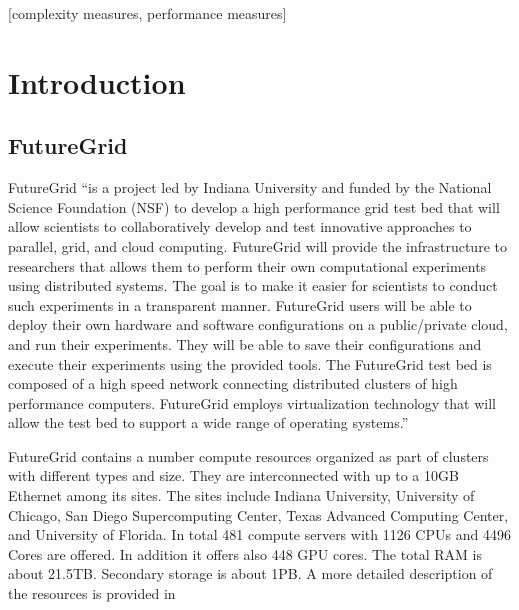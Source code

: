 \documentclass{tex/sig-alternate}
\begin{document}
[complexity measures, performance measures] 
 
 
 

\section{Introduction}

\subsection{FutureGrid}



FutureGrid \cite{las2010gce,las12fg-bookchapter} ``is a project led by
Indiana University and funded by the National Science Foundation (NSF)
to develop a high performance grid test bed that will allow scientists
to collaboratively develop and test innovative approaches to parallel,
grid, and cloud computing. FutureGrid will provide the infrastructure
to researchers that allows them to perform their own computational
experiments using distributed systems. The goal is to make it easier
for scientists to conduct such experiments in a transparent manner.
FutureGrid users will be able to deploy their own hardware and
software configurations on a public/private cloud, and run their
experiments. They will be able to save their configurations and
execute their experiments using the provided tools. The FutureGrid
test bed is composed of a high speed network connecting distributed
clusters of high performance computers. FutureGrid employs
virtualization technology that will allow the test bed to support a
wide range of operating systems.''



FutureGrid contains a number compute resources organized as part of
clusters with different types and size. They are interconnected with up to a 10GB Ethernet among its sites. The sites include Indiana University, University of Chicago, San Diego Supercomputing Center, Texas Advanced Computing Center, and University of Florida.
In total 481 compute servers with 1126 CPUs and 4496 Cores are
offered. In addition it offers also 448 GPU cores. The total RAM is
about 21.5TB. Secondary storage is about 1PB. A more detailed
description of the resources is provided in
\cite{vonLaszewski-bigdata-bookchapter2014}
\end{document}
